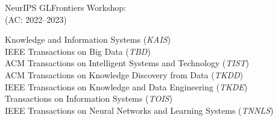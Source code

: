 \documentclass[10pt]{article}
\newenvironment{myindentpar}[1]%
{\begin{list}{}%
         {\setlength{\leftmargin}{#1}}%
         \item[]%
}
{\end{list}}
\newcounter{list}
\begin{document}
\begin{myindentpar}{0.75cm}
{NeurIPS GLFrontiers Workshop: \\
(AC: 2022--2023)

}


\hspace{-0.75cm}{\bf Journal Reviewer}

{\small

Knowledge and Information Systems (\textit{KAIS}) \\
IEEE Transactions on Big Data (\textit{TBD}) \\
ACM Transactions on Intelligent Systems and Technology (\textit{TIST}) \\
ACM Transactions on Knowledge Discovery from Data (\textit{TKDD}) \\
IEEE Transactions on Knowledge and Data Engineering (\textit{TKDE}) \\
Transactions on Information Systems (\textit{TOIS}) \\
IEEE Transactions on Neural Networks and Learning Systems (\textit{TNNLS})

}
\end{myindentpar}
\end{document}
